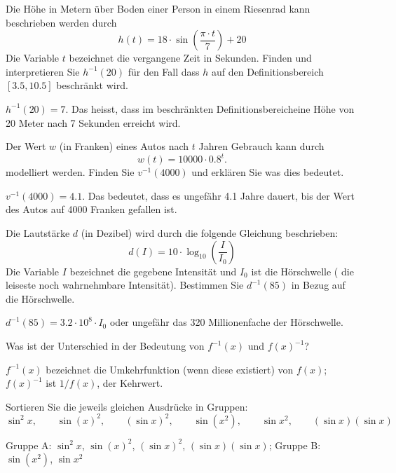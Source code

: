 \begin{exercises}
\begin{exercise}
Die Höhe in Metern über Boden einer Person in einem Riesenrad kann beschrieben werden durch
\[
h(t) = 18\cdot \sin( \frac{\pi \cdot t}{7} ) + 20
\]
Die Variable $t$ bezeichnet die vergangene Zeit in Sekunden. Finden und interpretieren Sie $h^{-1}(20)$ für den Fall dass $h$ auf den Definitionsbereich $[3.5, 10.5]$ beschränkt wird.
\begin{answer}
$h^{-1}(20)=7$. Das heisst, dass im beschränkten Definitionsbereicheine Höhe von 20 Meter nach 7 Sekunden erreicht wird.
\end{answer}
\end{exercise}


\begin{exercise}
Der Wert $w$ (in Franken) eines Autos nach $t$ Jahren Gebrauch kann durch
\[
w(t) = 10000\cdot 0.8^{t}.
\]
modelliert werden.
Finden Sie  $v^{-1}(4000)$ und erklären Sie was dies bedeutet.
\begin{answer}
$v^{-1}(4000) = 4.1$.  Das bedeutet, dass es ungefähr 4.1 Jahre dauert, bis der Wert des Autos auf 4000 Franken gefallen ist.
\end{answer}
\end{exercise}



\begin{exercise}
Die Lautstärke $d$ (in Dezibel) wird durch die folgende Gleichung beschrieben:
\[
d(I) = 10\cdot \log_{10}\left(\frac{I}{I_0}\right)
\]
Die Variable $I$ bezeichnet die gegebene Intensität und $I_{0}$ ist die Hörschwelle ( die leiseste noch wahrnehmbare Intensität).  Bestimmen Sie  $d^{-1}(85)$ in Bezug auf die Hörschwelle.
\begin{answer}
$d^{-1}(85) = 3.2 \cdot 10^{8} \cdot  I_0$ oder ungefähr das 320 Millionenfache der Hörschwelle.
\end{answer}
\end{exercise}



\begin{exercise}

Was ist der Unterschied in der Bedeutung von $f^{-1}(x)$ und $f(x)^{-1}$?
\begin{answer}
$f^{-1}(x)$ bezeichnet die Umkehrfunktion (wenn diese existiert) von $f(x)$;
  $f(x)^{-1}$ ist $1/f(x)$, der Kehrwert.
\end{answer}
\end{exercise}



\begin{exercise}
Sortieren Sie die jeweils gleichen Ausdrücke in Gruppen:
\[
\sin^2 x, \qquad \sin(x)^2, \qquad (\sin x)^2, \qquad \sin(x^2), \qquad  \sin x^2, \qquad (\sin x)(\sin x)
\]
\begin{answer}
Gruppe A: $\sin^2x$, $\sin(x)^2$, $(\sin x)^2$, $(\sin x)(\sin x)$;
Gruppe B: $\sin(x^2)$, $\sin x^2$
\end{answer}
\end{exercise}


\end{exercises}
